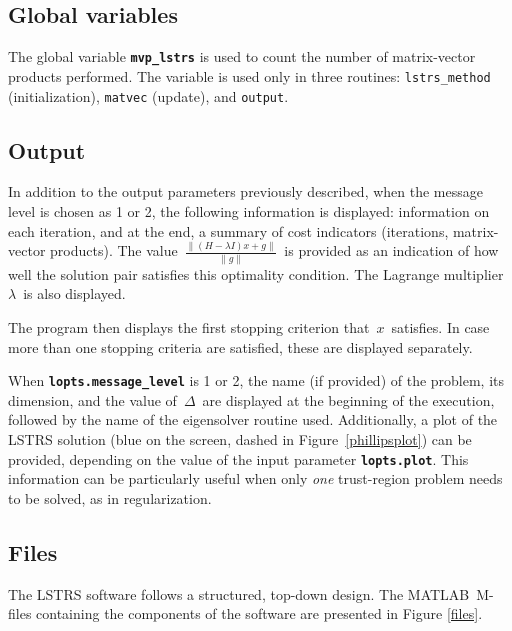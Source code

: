 \documentclass[acmtoms]{acmtrans2m}
\newcommand{\norm}{\|}
\newcommand{\rad}{{\Delta}}
\newcommand{\matlab}{MATLAB}
\begin{document}
\subsection{Global variables}\label{globalvar}
The global variable {\tt\bf mvp\_lstrs} is used to count the number of
matrix-vector products performed. The variable is used only in three routines:
{\tt lstrs\_method} (initialization), {\tt matvec} (update), and
{\tt output}.

\newpage
\subsection{Output}\label{results}

In addition to the output parameters previously described, when the
message level is chosen as 1 or 2, the following information is
displayed: information on each iteration, and at the end,
a summary of cost indicators (iterations, matrix-vector products).
The value\ $\frac{\norm (H -\lambda I)x + g\norm}{\norm g\norm}$\ is 
provided as an indication of
how well the solution pair satisfies this optimality condition.
The Lagrange multiplier\ $\lambda$\ is also displayed.

The program then displays the first stopping criterion that\ $x$\ satisfies.
In case more than one stopping criteria are satisfied, these are
displayed separately.

When {\tt\bf lopts.message\_level} is 1 or 2, the name
(if provided) of the problem, its dimension, and
the value of\ $\rad$\ are displayed at the beginning of the execution, followed
by the name of the eigensolver routine used. Additionally,
a plot of the LSTRS solution (blue on the screen, dashed in
Figure~\ref{phillipsplot}) can be provided, depending on the value
of the input parameter {\tt\bf lopts.plot}. 
This information can be particularly useful
when only {\em one} trust-region problem needs to be solved, as in regularization.
 
\subsection{Files}

The LSTRS software follows a structured, top-down design. The 
\matlab\ M-files containing the components of the software are presented in
Figure \ref{files}.
\end{document}
